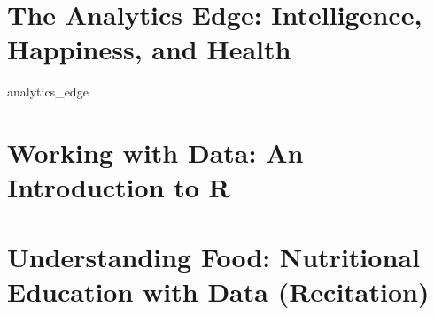 \documentclass[10pt,letterpaper,titlepage, fullpage]{article}
\begin{document}
\section{The Analytics Edge: Intelligence, Happiness, and Health}
  {analytics_edge}

\section{Working with Data: An Introduction to R}

\section{Understanding Food: Nutritional Education with Data (Recitation)}

\end{document}
